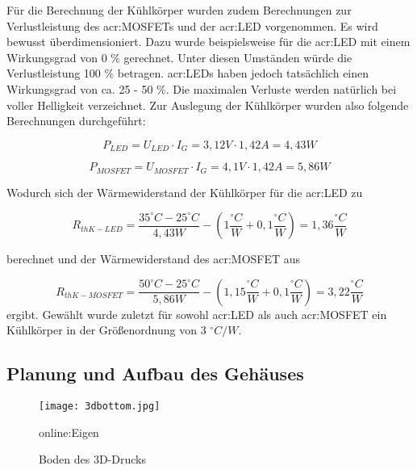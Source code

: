 Für die Berechnung der Kühlkörper wurden zudem Berechnungen zur Verlustleistung des
\gls{acr:MOSFET}s und der \gls{acr:LED} vorgenommen. Es wird bewusst überdimensioniert. Dazu wurde beispielsweise für die \gls{acr:LED} mit einem Wirkungsgrad von 0 \% gerechnet. Unter diesen Umständen würde die Verlustleistung 100 \% betragen. \gls{acr:LED}s haben jedoch tatsächlich einen Wirkungsgrad von ca. 25 - 50 \%. Die maximalen Verluste werden natürlich bei voller Helligkeit verzeichnet. Zur Auslegung der Kühlkörper wurden also folgende Berechnungen durchgeführt:

\begin{equation}
	\label{equ:thermoled}
	P_{LED} = U_{LED} \cdot I_{G} = 3,12V \cdot 1,42A= 4,43W
\end{equation}

\begin{equation}
	\label{equ:thermomos}
	P_{MOSFET} = U_{MOSFET} \cdot I_{G} = 4,1V \cdot 1,42A= 5,86W
\end{equation}

Wodurch sich der Wärmewiderstand der Kühlkörper für die \gls{acr:LED} zu

\begin{equation}
	\label{equ:thermo2}
	R_{thK-LED} = \frac{35 ^\circ C - 25 ^\circ C}{4,43W}-(1 \frac{^\circ C}{W}+0,1 \frac{^\circ C}{W}) = 1,36\frac{^\circ C}{W}
\end{equation}

berechnet und der Wärmewiderstand des \gls{acr:MOSFET} aus
 
\begin{equation}
	\label{equ:thermo3}
	R_{thK-MOSFET} = \frac{50 ^\circ C - 25 ^\circ C}{5,86W}-(1,15 \frac{^\circ C}{W}+0,1 \frac{^\circ C}{W}) = 3,22\frac{^\circ C}{W}
\end{equation}
ergibt. Gewählt wurde zuletzt für sowohl \gls{acr:LED} als auch \gls{acr:MOSFET} ein Kühlkörper in der Größenordnung von 3 $^\circ C/W$.


\subsection{Planung und Aufbau des Gehäuses}
\label{subsec:Unterabschnitt12}

\begin{figure}[H]
	\centering
	\texttt{[image: 3dbottom.jpg]}
	\caption[Boden des 3D-Drucks]{Boden des 3D-Drucks} \gls{online:Eigen}
	\label{fig:3dbottom}
\end{figure}

